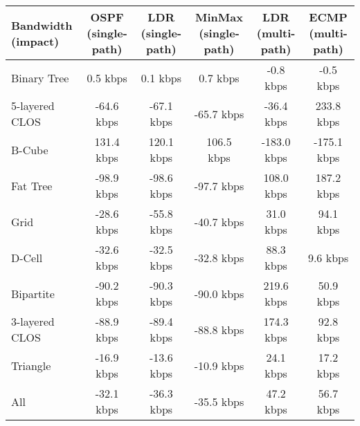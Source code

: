 \begin{tabular}{l|ccccc}
Bandwidth (impact) & OSPF (single-path) & LDR (single-path) & MinMax (single-path) & LDR (multi-path) & ECMP (multi-path) \\
\hline
Binary Tree        & 0.5 kbps           & 0.1 kbps          & 0.7 kbps             & -0.8 kbps        & -0.5 kbps         \\
5-layered CLOS     & -64.6 kbps         & -67.1 kbps        & -65.7 kbps           & -36.4 kbps       & 233.8 kbps        \\
B-Cube             & 131.4 kbps         & 120.1 kbps        & 106.5 kbps           & -183.0 kbps      & -175.1 kbps       \\
Fat Tree           & -98.9 kbps         & -98.6 kbps        & -97.7 kbps           & 108.0 kbps       & 187.2 kbps        \\
Grid               & -28.6 kbps         & -55.8 kbps        & -40.7 kbps           & 31.0 kbps        & 94.1 kbps         \\
D-Cell             & -32.6 kbps         & -32.5 kbps        & -32.8 kbps           & 88.3 kbps        & 9.6 kbps          \\
Bipartite          & -90.2 kbps         & -90.3 kbps        & -90.0 kbps           & 219.6 kbps       & 50.9 kbps         \\
3-layered CLOS     & -88.9 kbps         & -89.4 kbps        & -88.8 kbps           & 174.3 kbps       & 92.8 kbps         \\
Triangle           & -16.9 kbps         & -13.6 kbps        & -10.9 kbps           & 24.1 kbps        & 17.2 kbps         \\
All                & -32.1 kbps         & -36.3 kbps        & -35.5 kbps           & 47.2 kbps        & 56.7 kbps         \\
\end{tabular}